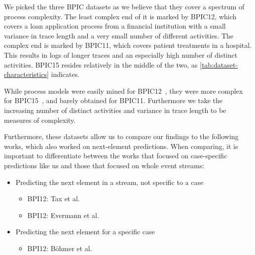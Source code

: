 We picked the three BPIC datasets as we believe that they cover a spectrum of process complexity. The least complex end of it is marked by BPIC12, which covers a loan application process from a financial institution with a small variance in trace length and a very small number of different activities. The complex end is marked by BPIC11, which covers patient treatments in a hospital. This results in logs of longer traces and an especially high number of distinct activities. BPIC15 resides relatively in the middle of the two, as \autoref{tab:dataset-characteristics} indicates.

While process models were easily mined for BPIC12~\cite{adriansyah2012mining}, they were more complex for BPIC15~\cite{van2015benchmarking}, and barely obtained for BPIC11. Furthermore we take the increasing number of distinct activities and variance in trace length to be measures of complexity.

Furthermore, these datasets allow us to compare our findings to the following works, which also worked on next-element predictions. When comparing, it is important to differentiate between the works that focused on case-specific predictions like us and those that focused on whole event streams:

\begin{itemize}
    \item Predicting the next element in a stream, not specific to a case
    \begin{itemize}
        \item BPI12: Tax et al.~\cite{tax2017}
        \item BPI12: Evermann et al.~\cite{evermann2016}
    \end{itemize}
    \item Predicting the next element for a specific case
    \begin{itemize}
        \item BPI12: Böhmer et al.~\cite{boehmer2018probability}
    \end{itemize}
\end{itemize}

